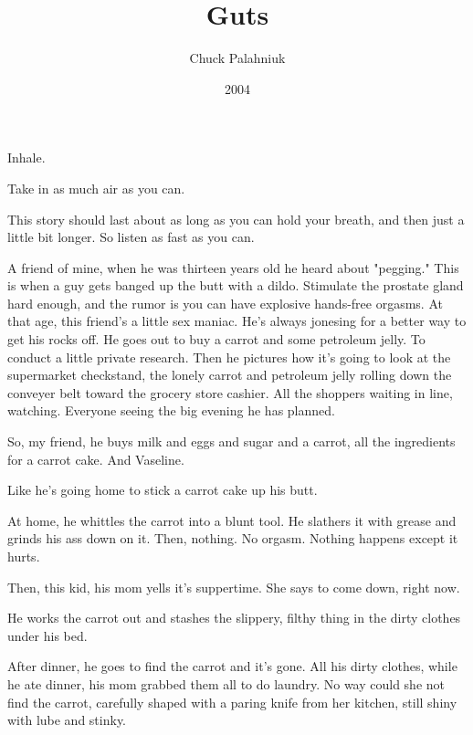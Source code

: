 \documentclass[10pt,a5paper,twoside]{book}
\begin{document}
\title{Guts}
\date{2004}
\author{Chuck Palahniuk}


\maketitle
    
\noindent\linenumbers Inhale.

Take in as much air as you can.

This story should last about as long as you can hold your breath, and then just a little bit longer. So listen as fast as you can.

A friend of mine, when he was thirteen years old he heard about "pegging." This is when a guy gets banged up the butt with a dildo. Stimulate the prostate gland hard enough, and the rumor is you can have explosive hands-free orgasms. At that age, this friend's a little sex maniac. He's always jonesing for a better way to get his rocks off. He goes out to buy a carrot and some petroleum jelly. To conduct a little private research. Then he pictures how it's going to look at the supermarket checkstand, the lonely carrot and petroleum jelly rolling down the conveyer belt toward the grocery store cashier. All the shoppers waiting in line, watching. Everyone seeing the big evening he has planned.

So, my friend, he buys milk and eggs and sugar and a carrot, all the ingredients for a carrot cake. And Vaseline.

Like he's going home to stick a carrot cake up his butt.

At home, he whittles the carrot into a blunt tool. He slathers it with grease and grinds his ass down on it. Then, nothing. No orgasm. Nothing happens except it hurts.

Then, this kid, his mom yells it's suppertime. She says to come down, right now.

He works the carrot out and stashes the slippery, filthy thing in the dirty clothes under his bed.

After dinner, he goes to find the carrot and it's gone. All his dirty clothes, while he ate dinner, his mom grabbed them all to do laundry. No way could she not find the carrot, carefully shaped with a paring knife from her kitchen, still shiny with lube and stinky.
\end{document}
